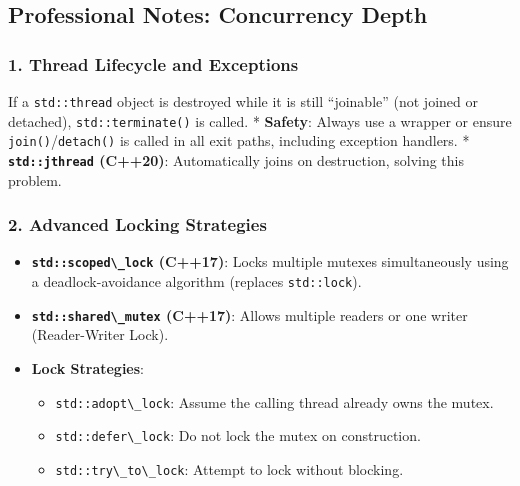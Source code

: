 \hypertarget{professional-notes-concurrency-depth}{%
\subsection{Professional Notes: Concurrency
Depth}\label{professional-notes-concurrency-depth}}

\hypertarget{thread-lifecycle-and-exceptions}{%
\subsubsection{1. Thread Lifecycle and
Exceptions}\label{thread-lifecycle-and-exceptions}}

If a \passthrough{\lstinline!std::thread!} object is destroyed while it
is still ``joinable'' (not joined or detached),
\passthrough{\lstinline!std::terminate()!} is called. * \textbf{Safety}:
Always use a wrapper or ensure
\passthrough{\lstinline!join()!}/\passthrough{\lstinline!detach()!} is
called in all exit paths, including exception handlers. *
\textbf{\passthrough{\lstinline!std::jthread!} (C++20)}: Automatically
joins on destruction, solving this problem.

\hypertarget{advanced-locking-strategies}{%
\subsubsection{2. Advanced Locking
Strategies}\label{advanced-locking-strategies}}

\begin{itemize}
\tightlist
\item
  \textbf{\passthrough{\lstinline!std::scoped\_lock!} (C++17)}: Locks
  multiple mutexes simultaneously using a deadlock-avoidance algorithm
  (replaces \passthrough{\lstinline!std::lock!}).
\item
  \textbf{\passthrough{\lstinline!std::shared\_mutex!} (C++17)}: Allows
  multiple readers or one writer (Reader-Writer Lock).
\item
  \textbf{Lock Strategies}:

  \begin{itemize}
  \tightlist
  \item
    \passthrough{\lstinline!std::adopt\_lock!}: Assume the calling
    thread already owns the mutex.
  \item
    \passthrough{\lstinline!std::defer\_lock!}: Do not lock the mutex on
    construction.
  \item
    \passthrough{\lstinline!std::try\_to\_lock!}: Attempt to lock
    without blocking.
  \end{itemize}
\end{itemize}

